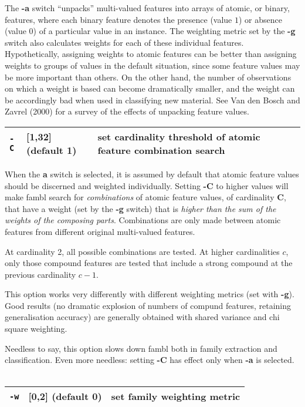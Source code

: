 \documentclass[11pt]{article}
\begin{document}
The {\bf -a} switch ``unpacks'' multi-valued features into arrays of
atomic, or binary, features, where each binary feature denotes the
presence (value $1$) or absence (value $0$) of a particular value in
an instance. The weighting metric set by the {\bf -g} switch also
calculates weights for each of these individual
features. Hypothetically, assigning weights to atomic features can be
better than assigning weights to groups of values in the default
situation, since some feature values may be more important than
others. On the other hand, the number of observations on which a
weight is based can become dramatically smaller, and the weight can be
accordingly bad when used in classifying new material. See Van den
Bosch and Zavrel (2000) for a survey of the effects of unpacking
feature values.  \ \\

\begin{tabular}{|p{}|p{}|p{}|}
\hline
{\tt -C} & [1,32] (default 1) & set cardinality threshold of atomic feature combination search  \\
\hline
\end{tabular}

When the {\bf a} switch is selected, it is assumed by default that
atomic feature values should be discerned and weighted
individually. Setting {\bf -C} to higher values will make {\sc fambl}
search for {\em combinations} of atomic feature values, of cardinality
{\bf C}, that have a weight (set by the {\bf -g} switch) that is {\em
higher than the sum of the weights of the composing
parts}. Combinations are only made between atomic features from
different original multi-valued features. 

At cardinality 2, all possible combinations are tested. At higher
cardinalities $c$, only those compound features are tested that include
a strong compound at the previous cardinality $c-1$.

This option works very differently with different weighting metrics
(set with {\bf -g}). Good results (no dramatic explosion of numbers of
compund features, retaining generalisation accuracy) are generally
obtained with shared variance and chi square weighting.

Needless to say, this option slows down {\sc fambl} both in family
extraction and classification. Even more needless: setting {\bf -C}
has effect only when {\bf -a} is selected.
\ \\

\begin{tabular}{|p{}|p{}|p{}|}
\hline
{\tt -w} & [0,2] (default 0) & set family weighting metric \\
\hline
\end{tabular}
\end{document}
